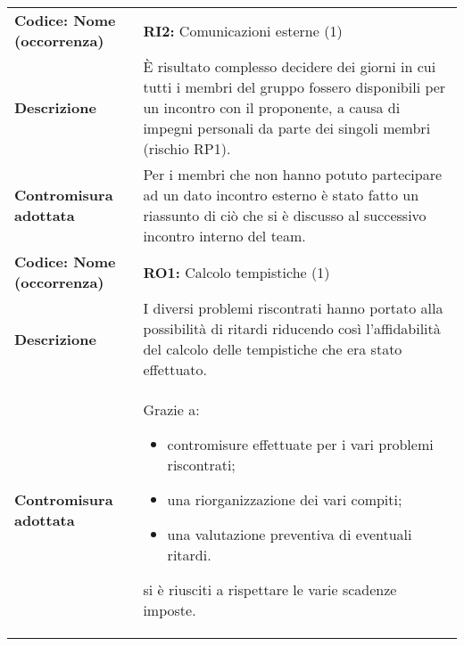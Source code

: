 {\begin{longtable}{C{3.5cm} | C{11cm}}
\hline
\hline
{}\textbf{Codice: Nome (occorrenza)} & \textbf{RI2: }{Comunicazioni esterne (1)}\\ 
\textbf{Descrizione} & È risultato complesso decidere dei giorni in cui tutti i membri del gruppo fossero disponibili per un incontro con il proponente, a causa di impegni personali da parte dei singoli membri (rischio RP1).\\ 
\textbf{Contromisura adottata} & Per i membri che non hanno potuto partecipare ad un dato incontro esterno è stato fatto un riassunto di ciò che si è discusso al successivo incontro interno del team.\\
\hline
\hline
{}\textbf{Codice: Nome (occorrenza)} & \textbf{RO1: }{Calcolo tempistiche (1)}\\
\textbf{Descrizione} & I diversi problemi riscontrati hanno portato alla possibilità di ritardi riducendo così l'affidabilità del calcolo delle tempistiche che era stato effettuato.\\
\textbf{Contromisura adottata} & Grazie a: 
\begin{itemize}
\item contromisure effettuate per i vari problemi riscontrati;
\item una riorganizzazione dei vari compiti;
\item una valutazione preventiva di eventuali ritardi.
\end{itemize} 
si è riusciti a rispettare le varie scadenze imposte.\\
\hline
\hline
\end{longtable}
}
